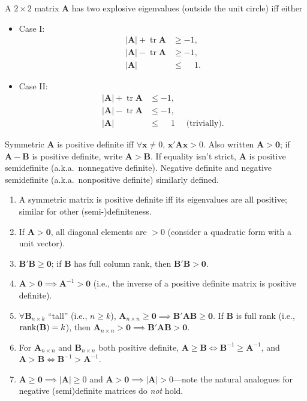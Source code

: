 \documentclass[8pt,letterpaper, landscape]{extarticle} %
\newcommand{\mA}{\ensuremath{\mathbf{A}}}
\newcommand{\mB}{\ensuremath{\mathbf{B}}}
\newcommand{\mx}{\ensuremath{\mathbf{x}}}
\newcommand{\mzero}{\ensuremath{\mathbf{0}}}
\begin{document}
\begin{multicols}{3}
\begin{description}
A $ 2 \times 2 $ matrix $ \mA $ has two explosive eigenvalues (outside the unit circle) iff either
\begin{itemize}
\item Case I:
\begin{align*}
| \mA | + \operatorname{tr} \mA &\geq -1 , \\
| \mA | - \operatorname{tr} \mA &\geq -1 , \\
| \mA | \phantom{{} + \operatorname{tr} \mA} &\leq \phantom{-} 1 .
\end{align*}
\item Case II:
\begin{align*}
| \mA | + \operatorname{tr} \mA &\leq -1 , \\
| \mA | - \operatorname{tr} \mA &\leq -1 , \\
| \mA | \phantom{{} + \operatorname{tr} \mA} &\leq \phantom{-} 1 \quad \text{ (trivially)}.
\end{align*}
\end{itemize}

 Symmetric $ \mA $ is positive definite iff $ \forall \mx \neq 0 $, $ \mx' \mA \mx > 0 $. Also written $ \mA > \mzero $; if $ \mA - \mB $ is positive definite, write $ \mA > \mB $. If equality isn't strict, $ \mA $ is positive semidefinite (a.k.a.\ nonnegative definite). Negative definite and negative semidefinite (a.k.a.\ nonpositive definite) similarly defined.
\begin{enumerate}
\item A symmetric matrix is positive definite iff its eigenvalues are all positive; similar for other (semi-)definiteness.
\item If $ \mA > \mzero $, all diagonal elements are $ >0 $ (consider a quadratic form with a unit vector).
\item $ \mB' \mB \geq \mzero $; if $ \mB $ has full column rank, then $ \mB' \mB > \mzero $.
\item $ \mA > \mzero \implies \mA^{-1} > \mzero $ (i.e., the inverse of a positive definite matrix is positive definite).
\item $ \forall \mB_{n \times k} $ ``tall'' (i.e., $ n \geq k $), $ \mA_{n \times n} \geq \mzero \implies \mB' \mA \mB \geq \mzero $. If $ \mB $ is full rank (i.e., $ \rank(\mB) = k $), then $ \mA_{n \times n} > \mzero \implies \mB' \mA \mB > \mzero $.
\item For $ \mA_{n \times n} $ and $ \mB_{n \times n} $ both positive definite, $ \mA \geq \mB \iff \mB^{-1} \geq \mA^{-1} $, and $ \mA > \mB \iff \mB^{-1} > \mA^{-1} $.
\item $ \mA \geq \mzero \implies \lvert \mA \rvert \geq 0 $ and $ \mA > \mzero \implies \lvert \mA \rvert > 0 $---note the natural analogues for negative (semi)definite matrices do \textit{not} hold.
\end{enumerate}


\end{description}
\end{multicols}
\end{document}
